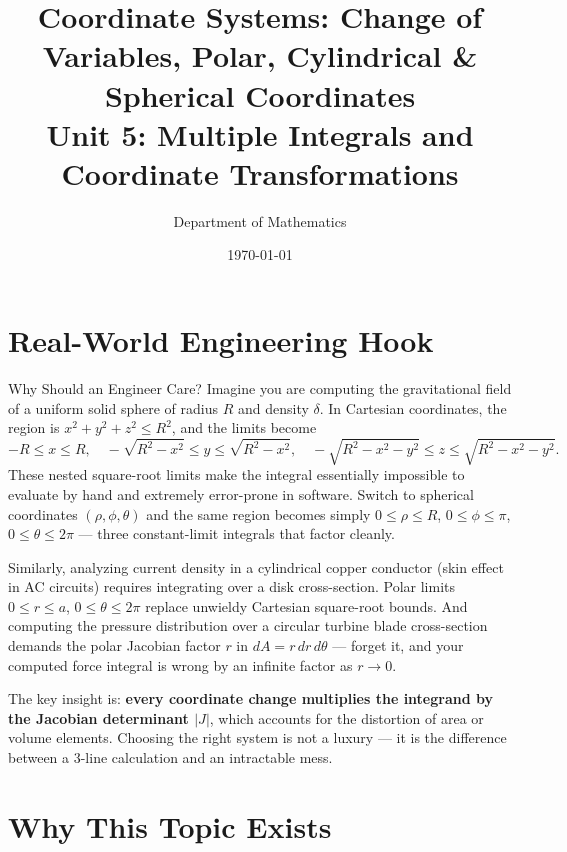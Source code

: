 \documentclass[12pt,a4paper]{article}
\title{\textbf{Coordinate Systems: Change of Variables, Polar, Cylindrical \& Spherical Coordinates} \\ \large Unit 5: Multiple Integrals and Coordinate Transformations}
\author{Department of Mathematics}
\date{\today}
\begin{document}
\maketitle
\tableofcontents
\newpage

\section{Real-World Engineering Hook}

\begin{curiositybox}{Why Should an Engineer Care?}
Imagine you are computing the gravitational field of a uniform solid sphere of radius $R$ and density $\delta$.
In Cartesian coordinates, the region is $x^2 + y^2 + z^2 \leq R^2$, and the limits become
\[
  -R \leq x \leq R, \quad -\sqrt{R^2 - x^2} \leq y \leq \sqrt{R^2 - x^2}, \quad
  -\sqrt{R^2 - x^2 - y^2} \leq z \leq \sqrt{R^2 - x^2 - y^2}.
\]
These nested square-root limits make the integral essentially impossible to evaluate by hand and extremely error-prone
in software. Switch to spherical coordinates $(\rho, \phi, \theta)$ and the same region becomes simply
$0 \leq \rho \leq R$, $0 \leq \phi \leq \pi$, $0 \leq \theta \leq 2\pi$ --- three constant-limit integrals that
factor cleanly.

Similarly, analyzing current density in a cylindrical copper conductor (skin effect in AC circuits) requires
integrating over a disk cross-section. Polar limits $0 \leq r \leq a$, $0 \leq \theta \leq 2\pi$ replace
unwieldy Cartesian square-root bounds. And computing the pressure distribution over a circular turbine blade
cross-section demands the polar Jacobian factor $r$ in $dA = r\,dr\,d\theta$ --- forget it, and your computed
force integral is wrong by an infinite factor as $r \to 0$.

The key insight is: \textbf{every coordinate change multiplies the integrand by the Jacobian determinant $|J|$},
which accounts for the distortion of area or volume elements. Choosing the right system is not a luxury --- it is
the difference between a 3-line calculation and an intractable mess.
\end{curiositybox}

\section{Why This Topic Exists}
\end{document}
